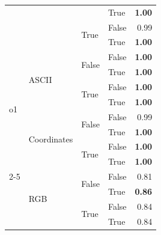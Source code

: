 \documentclass{article}
\begin{document}
\begin{table}
\begin{center}
{\begin{tabular}{@{}llllr@{}}
                                    &                                   &                           & True                      & \textbf{1.00} \\
                                    &                                   & \multirow[c]{2}{*}{True}  & False                     & 0.99 \\
                                    &                                   &                           & True                      & \textbf{1.00} \\
    \midrule
    \multirow[c]{8}{*}{o1}          & \multirow[c]{4}{*}{ASCII}         & \multirow[c]{2}{*}{False} & False                     & \textbf{1.00} \\
                                    &                                   &                           & True                      & \textbf{1.00} \\
                                    &                                   & \multirow[c]{2}{*}{True}  & False                     & \textbf{1.00} \\
                                    &                                   &                           & True                      & \textbf{1.00} \\
    \cmidrule{2-5}
                                    & \multirow[c]{4}{*}{Coordinates}   & \multirow[c]{2}{*}{False} & False                     & 0.99 \\
                                    &                                   &                           & True                      & \textbf{1.00} \\
                                    &                                   & \multirow[c]{2}{*}{True}  & False                     & \textbf{1.00} \\
                                    &                                   &                           & True                      & \textbf{1.00} \\
    \cmidrule{2-5}
                                    & \multirow[c]{4}{*}{RGB}           & \multirow[c]{2}{*}{False} & False                     & 0.81 \\
                                    &                                   &                           & True                      & \textbf{0.86} \\
                                    &                                   & \multirow[c]{2}{*}{True}  & False                     & 0.84 \\
                                    &                                   &                           & True                      & 0.84 \\
   \bottomrule
\end{tabular}
}
    \end{center}
    \label{tab:grid-world-ablation-openai}
\end{table}
\end{document}
